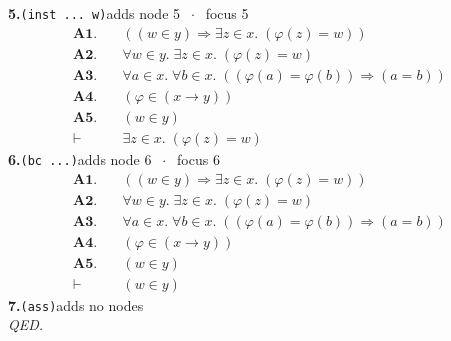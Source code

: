 \documentclass[11pt]{article}
\begin{document}
\medskip\noindent\textbf{5.}\quad \texttt{(inst ... w)}\hfill{\small adds node 5 $\;\cdot\;$ focus 5}\\[2pt]
\begin{align*}
  \mathbf{A1.}\quad & ((w \in y) \Rightarrow \exists z \in x.\; (\varphi(z) = w)) \\
  \mathbf{A2.}\quad & \forall w \in y.\; \exists z \in x.\; (\varphi(z) = w) \\
  \mathbf{A3.}\quad & \forall a \in x.\; \forall b \in x.\; ((\varphi(a) = \varphi(b)) \Rightarrow (a = b)) \\
  \mathbf{A4.}\quad & (\varphi \in (x \to y)) \\
  \mathbf{A5.}\quad & (w \in y) \\
  \vdash\quad & \exists z \in x.\; (\varphi(z) = w)
\end{align*}
\medskip\noindent\textbf{6.}\quad \texttt{(bc ...)}\hfill{\small adds node 6 $\;\cdot\;$ focus 6}\\[2pt]
\begin{align*}
  \mathbf{A1.}\quad & ((w \in y) \Rightarrow \exists z \in x.\; (\varphi(z) = w)) \\
  \mathbf{A2.}\quad & \forall w \in y.\; \exists z \in x.\; (\varphi(z) = w) \\
  \mathbf{A3.}\quad & \forall a \in x.\; \forall b \in x.\; ((\varphi(a) = \varphi(b)) \Rightarrow (a = b)) \\
  \mathbf{A4.}\quad & (\varphi \in (x \to y)) \\
  \mathbf{A5.}\quad & (w \in y) \\
  \vdash\quad & (w \in y)
\end{align*}
\medskip\noindent\textbf{7.}\quad \texttt{(ass)}\hfill{\small adds no nodes}\\[2pt]
\emph{QED.}\par
\end{document}
